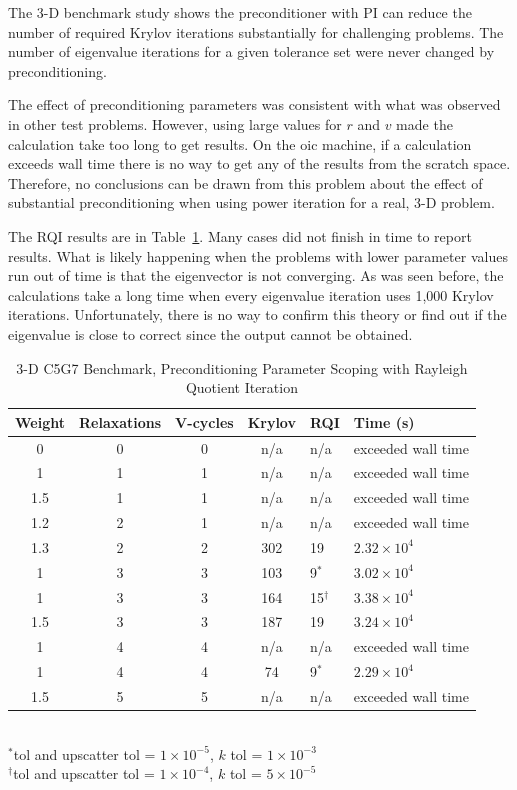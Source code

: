 The 3-D benchmark study shows the preconditioner with PI can reduce the number of required Krylov iterations substantially for challenging problems. The number of eigenvalue iterations for a given tolerance set were never changed by preconditioning. 

The effect of preconditioning parameters was consistent with what was observed in other test problems. However, using large values for $r$ and $v$ made the calculation take too long to get results. On the oic machine, if a calculation exceeds wall time there is no way to get any of the results from the scratch space. Therefore, no conclusions can be drawn from this problem about the effect of substantial preconditioning when using power iteration for a real, 3-D problem. 

The RQI results are in Table~\ref{table:3-D c5g7 rqi}. Many cases did not finish in time to report results. What is likely happening when the problems with lower parameter values run out of time is that the eigenvector is not converging. As was seen before, the calculations take a long time when every eigenvalue iteration uses 1,000 Krylov iterations. Unfortunately, there is no way to confirm this theory or find out if the eigenvalue is close to correct since the output cannot be obtained. 
%
\begin{table}[!h]
\caption{3-D C5G7 Benchmark, Preconditioning Parameter Scoping with Rayleigh Quotient Iteration}
\begin{center}
\begin{tabular}{| c | c | c | c | l | l |}
\hline
Weight & Relaxations & V-cycles & Krylov & RQI & Time (s) \\[0.5ex]
\hline
0    & 0 & 0 & n/a     & n/a          & exceeded wall time \\
1    & 1 & 1 & n/a     & n/a          & exceeded wall time \\
1.5 & 1 & 1 & n/a     & n/a          & exceeded wall time \\
1.2 & 2 & 1 & n/a     & n/a          & exceeded wall time \\
1.3 & 2 & 2 & 302    & 19           & $2.32 \times 10^{4}$ \\
1    & 3 & 3 & 103    & 9$^{*}$    & $3.02 \times 10^{4}$ \\
1    & 3 & 3 & 164    & 15$^{\dag}$ & $3.38 \times 10^{4}$ \\
1.5 & 3 & 3 & 187    & 19           & $3.24 \times 10^{4}$ \\
1    & 4 & 4 & n/a     & n/a          & exceeded wall time \\
1    & 4 & 4 & 74     & 9$^{*}$    & $2.29 \times 10^{4}$ \\
1.5 & 5 & 5 & n/a     & n/a          & exceeded wall time \\
\hline 
\end{tabular}\\
$^{*}$tol and upscatter tol = $1 \times 10^{-5}$, $k$ tol = $1 \times 10^{-3}$\\
$^{\dag}$tol and upscatter tol = $1 \times 10^{-4}$, $k$ tol = $5 \times 10^{-5}$
\end{center}
\label{table:3-D c5g7 rqi}
\end{table}  

